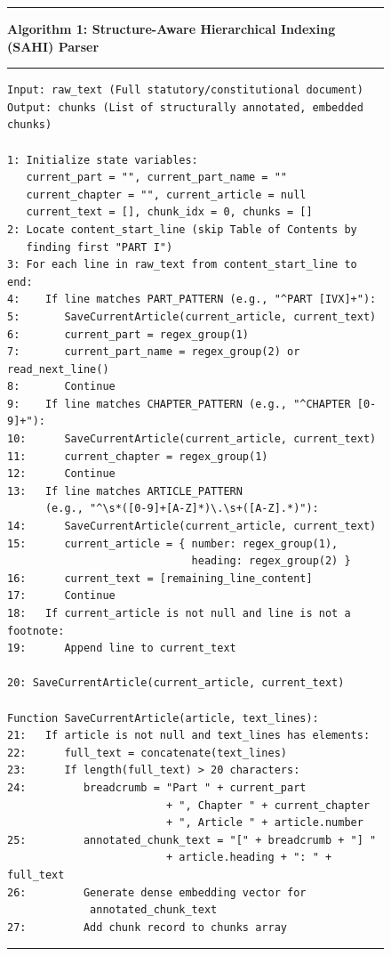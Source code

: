 \begin{figure}[H]
\centering
\begin{minipage}{0.95\linewidth}
\hrule
\vspace{0.5em}
\textbf{Algorithm 1: Structure-Aware Hierarchical Indexing (SAHI) Parser}
\vspace{0.5em}
\hrule
\vspace{0.5em}
\begin{verbatim}
Input: raw_text (Full statutory/constitutional document)
Output: chunks (List of structurally annotated, embedded chunks)

1: Initialize state variables:
   current_part = "", current_part_name = ""
   current_chapter = "", current_article = null
   current_text = [], chunk_idx = 0, chunks = []
2: Locate content_start_line (skip Table of Contents by
   finding first "PART I")
3: For each line in raw_text from content_start_line to end:
4:    If line matches PART_PATTERN (e.g., "^PART [IVX]+"):
5:       SaveCurrentArticle(current_article, current_text)
6:       current_part = regex_group(1)
7:       current_part_name = regex_group(2) or read_next_line()
8:       Continue
9:    If line matches CHAPTER_PATTERN (e.g., "^CHAPTER [0-9]+"):
10:      SaveCurrentArticle(current_article, current_text)
11:      current_chapter = regex_group(1)
12:      Continue
13:   If line matches ARTICLE_PATTERN
      (e.g., "^\s*([0-9]+[A-Z]*)\.\s+([A-Z].*)"):
14:      SaveCurrentArticle(current_article, current_text)
15:      current_article = { number: regex_group(1),
                             heading: regex_group(2) }
16:      current_text = [remaining_line_content]
17:      Continue
18:   If current_article is not null and line is not a footnote:
19:      Append line to current_text

20: SaveCurrentArticle(current_article, current_text)

Function SaveCurrentArticle(article, text_lines):
21:   If article is not null and text_lines has elements:
22:      full_text = concatenate(text_lines)
23:      If length(full_text) > 20 characters:
24:         breadcrumb = "Part " + current_part
                         + ", Chapter " + current_chapter
                         + ", Article " + article.number
25:         annotated_chunk_text = "[" + breadcrumb + "] "
                         + article.heading + ": " + full_text
26:         Generate dense embedding vector for
             annotated_chunk_text
27:         Add chunk record to chunks array
\end{verbatim}
\hrule
\end{minipage}
\end{figure}

